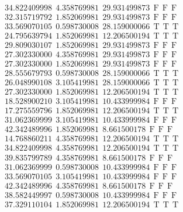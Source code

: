 \documentclass[10pt,a4paper]{article}
\begin{document}
\begin{itemize}
\begin{displaymath}
{\begin{aligned}
&34.822409998 ~~   4.358769981 ~~  29.931499873  ~~\mathrm{F  ~~ F  ~~  F} \\ 
&32.315719792 ~~   1.852069981 ~~  29.931499873  ~~\mathrm{F  ~~ F  ~~  F} \\ 
&33.569070105 ~~   0.598730008 ~~  28.159000066  ~~\mathrm{T  ~~ T  ~~ T } \\ 
&24.795639794 ~~   1.852069981 ~~  12.206500194  ~~\mathrm{T  ~~ T  ~~ T } \\ 
&29.809030107 ~~   1.852069981 ~~  29.931499873  ~~\mathrm{F  ~~ F  ~~  F} \\ 
&27.302330000 ~~   4.358769981 ~~  29.931499873  ~~\mathrm{F  ~~ F  ~~  F} \\ 
&27.302330000 ~~   1.852069981 ~~  29.931499873  ~~\mathrm{F  ~~ F  ~~  F} \\ 
&28.555679793 ~~   0.598730008 ~~  28.159000066  ~~\mathrm{T  ~~ T  ~~ T } \\ 
&26.048990108 ~~   3.105419981 ~~  28.159000066  ~~\mathrm{T  ~~ T  ~~ T } \\ 
&27.302330000 ~~   1.852069981 ~~  12.206500194  ~~\mathrm{T  ~~ T  ~~ T } \\ 
&18.528900210 ~~   3.105419981 ~~  10.433999984  ~~\mathrm{F  ~~ F  ~~  F} \\ 
&17.275559796 ~~   1.852069981 ~~  12.206500194  ~~\mathrm{T  ~~ T  ~~ T } \\ 
&31.062369999 ~~   3.105419981 ~~  10.433999984  ~~\mathrm{F  ~~ F  ~~  F} \\ 
&42.342489996 ~~   1.852069981 ~~   8.661500178  ~~\mathrm{F  ~~ F  ~~  F} \\ 
&14.768860211 ~~   4.358769981 ~~  12.206500194  ~~\mathrm{T  ~~ T  ~~ T } \\ 
&34.822409998 ~~   4.358769981 ~~  12.206500194  ~~\mathrm{T  ~~ T  ~~ T } \\ 
&39.835799789 ~~   4.358769981 ~~   8.661500178  ~~\mathrm{F  ~~ F  ~~  F} \\ 
&31.062369999 ~~   0.598730008 ~~  10.433999984  ~~\mathrm{F  ~~ F  ~~  F} \\ 
&33.569070105 ~~   3.105419981 ~~  10.433999984  ~~\mathrm{F  ~~ F  ~~  F} \\ 
&42.342489996 ~~   4.358769981 ~~   8.661500178  ~~\mathrm{F  ~~ F  ~~  F} \\ 
&38.582449997 ~~   0.598730008 ~~  10.433999984  ~~\mathrm{F  ~~ F  ~~  F} \\ 
&37.329110104 ~~   1.852069981 ~~  12.206500194  ~~\mathrm{T  ~~ T  ~~ T } \\ 

\end{aligned}}
\end{displaymath}
\end{itemize}
\end{document}
